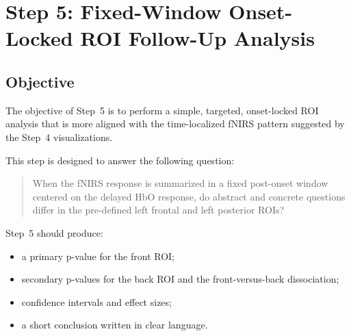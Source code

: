 \section{Step 5: Fixed-Window Onset-Locked ROI Follow-Up Analysis}
\label{sec:step5_fixed_window}

\subsection{Objective}
The objective of Step~5 is to perform a simple, targeted, onset-locked ROI analysis that is more
aligned with the time-localized fNIRS pattern suggested by the Step~4 visualizations.

This step is designed to answer the following question:
\begin{quote}
When the fNIRS response is summarized in a fixed post-onset window centered on the delayed HbO
response, do abstract and concrete questions differ in the pre-defined left frontal and left posterior
ROIs?
\end{quote}

Step~5 should produce:
\begin{itemize}
    \item a primary p-value for the front ROI;
    \item secondary p-values for the back ROI and the front-versus-back dissociation;
    \item confidence intervals and effect sizes;
    \item a short conclusion written in clear language.
\end{itemize}

